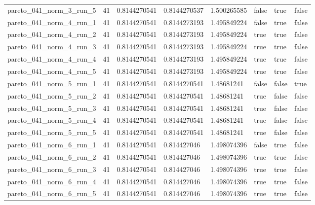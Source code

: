 \begin{tabular}{@{}llllllll@{}}
pareto\_041\_norm\_3\_run\_5 & 41 & 0.8144270541 & 0.8144270537 & 1.500265585 & false & true & false \\
pareto\_041\_norm\_4\_run\_1 & 41 & 0.8144270541 & 0.8144273193 & 1.495849224 & false & true & false \\
pareto\_041\_norm\_4\_run\_2 & 41 & 0.8144270541 & 0.8144273193 & 1.495849224 & true & true & false \\
pareto\_041\_norm\_4\_run\_3 & 41 & 0.8144270541 & 0.8144273193 & 1.495849224 & true & true & false \\
pareto\_041\_norm\_4\_run\_4 & 41 & 0.8144270541 & 0.8144273193 & 1.495849224 & true & true & false \\
pareto\_041\_norm\_4\_run\_5 & 41 & 0.8144270541 & 0.8144273193 & 1.495849224 & true & true & false \\
pareto\_041\_norm\_5\_run\_1 & 41 & 0.8144270541 & 0.8144270541 & 1.48681241 & false & false & true \\
pareto\_041\_norm\_5\_run\_2 & 41 & 0.8144270541 & 0.8144270541 & 1.48681241 & true & false & false \\
pareto\_041\_norm\_5\_run\_3 & 41 & 0.8144270541 & 0.8144270541 & 1.48681241 & true & false & false \\
pareto\_041\_norm\_5\_run\_4 & 41 & 0.8144270541 & 0.8144270541 & 1.48681241 & true & false & false \\
pareto\_041\_norm\_5\_run\_5 & 41 & 0.8144270541 & 0.8144270541 & 1.48681241 & true & false & false \\
pareto\_041\_norm\_6\_run\_1 & 41 & 0.8144270541 & 0.814427046 & 1.498074396 & false & true & false \\
pareto\_041\_norm\_6\_run\_2 & 41 & 0.8144270541 & 0.814427046 & 1.498074396 & true & true & false \\
pareto\_041\_norm\_6\_run\_3 & 41 & 0.8144270541 & 0.814427046 & 1.498074396 & true & true & false \\
pareto\_041\_norm\_6\_run\_4 & 41 & 0.8144270541 & 0.814427046 & 1.498074396 & true & true & false \\
pareto\_041\_norm\_6\_run\_5 & 41 & 0.8144270541 & 0.814427046 & 1.498074396 & true & true & false \\
\bottomrule
\end{tabular}
